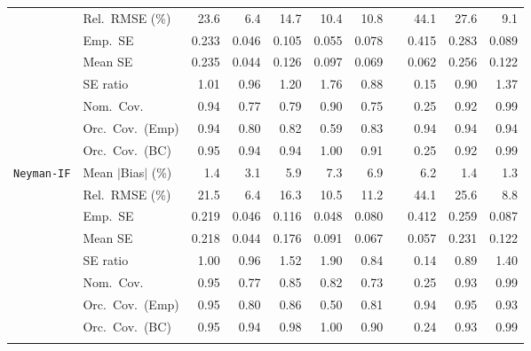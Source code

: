 \begin{landscape}
\begin{longtable}{llrrrrrrrrr}
 & Rel.\ RMSE (\%) & 23.6 & \cellcolor{rankone}6.4 & 14.7 & \cellcolor{rankthree}10.4 & 10.8 &  & 44.1 & 27.6 & \cellcolor{ranktwo}9.1 \\
 & Emp.\ SE & 0.233 & 0.046 & 0.105 & 0.055 & 0.078 &  & 0.415 & 0.283 & 0.089 \\
 & Mean SE & 0.235 & 0.044 & 0.126 & 0.097 & 0.069 &  & 0.062 & 0.256 & 0.122 \\
 & SE ratio & \cellcolor{rankone}1.01 & \cellcolor{ranktwo}0.96 & 1.20 & 1.76 & 0.88 &  & 0.15 & \cellcolor{rankthree}0.90 & 1.37 \\
 & Nom.\ Cov. & \cellcolor{rankone}0.94 & 0.77 & 0.79 & 0.90 & 0.75 &  & 0.25 & \cellcolor{ranktwo}0.92 & \cellcolor{rankthree}0.99 \\
 & Orc.\ Cov.\ (Emp) & \cellcolor{rankone}0.94 & 0.80 & \cellcolor{rankthree}0.82 & 0.59 & \cellcolor{ranktwo}0.83 &  & \cellcolor{rankone}0.94 & \cellcolor{rankone}0.94 & \cellcolor{rankone}0.94 \\
 & Orc.\ Cov.\ (BC) & \cellcolor{rankone}0.95 & \cellcolor{ranktwo}0.94 & \cellcolor{ranktwo}0.94 & 1.00 & 0.91 &  & 0.25 & \cellcolor{rankthree}0.92 & 0.99 \\
\addlinespace[2pt]
\quad \texttt{Neyman-IF} & Mean $|$Bias$|$ (\%) & \cellcolor{ranktwo}1.4 & \cellcolor{rankthree}3.1 & 5.9 & 7.3 & 6.9 &  & 6.2 & \cellcolor{ranktwo}1.4 & \cellcolor{rankone}1.3 \\
 & Rel.\ RMSE (\%) & 21.5 & \cellcolor{rankone}6.4 & 16.3 & \cellcolor{rankthree}10.5 & 11.2 &  & 44.1 & 25.6 & \cellcolor{ranktwo}8.8 \\
 & Emp.\ SE & 0.219 & 0.046 & 0.116 & 0.048 & 0.080 &  & 0.412 & 0.259 & 0.087 \\
 & Mean SE & 0.218 & 0.044 & 0.176 & 0.091 & 0.067 &  & 0.057 & 0.231 & 0.122 \\
 & SE ratio & \cellcolor{rankone}1.00 & \cellcolor{ranktwo}0.96 & 1.52 & 1.90 & 0.84 &  & 0.14 & \cellcolor{rankthree}0.89 & 1.40 \\
 & Nom.\ Cov. & \cellcolor{rankone}0.95 & 0.77 & 0.85 & 0.82 & 0.73 &  & 0.25 & \cellcolor{ranktwo}0.93 & \cellcolor{rankthree}0.99 \\
 & Orc.\ Cov.\ (Emp) & \cellcolor{rankone}0.95 & 0.80 & 0.86 & 0.50 & 0.81 &  & \cellcolor{ranktwo}0.94 & \cellcolor{rankone}0.95 & \cellcolor{rankthree}0.93 \\
 & Orc.\ Cov.\ (BC) & \cellcolor{rankone}0.95 & \cellcolor{ranktwo}0.94 & 0.98 & 1.00 & 0.90 &  & 0.24 & \cellcolor{rankthree}0.93 & 0.99 \\
\addlinespace[2pt]

\end{longtable}
\end{landscape}

